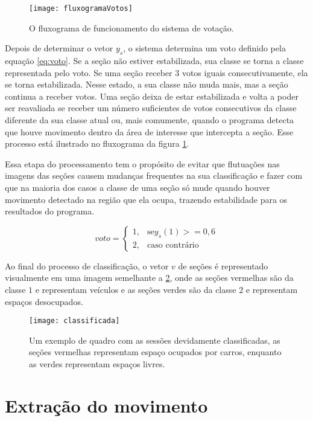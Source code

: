 \begin{figure}
	\centering
	\texttt{[image: fluxogramaVotos]}
	\label{fig:fluxogramaVotos}
	\caption{O fluxograma de funcionamento do sistema de votação.}
	\centering
\end{figure}


Depois de determinar o vetor $y_s$, o sistema determina um voto definido pela equação \ref{eq:voto}.  Se a seção não estiver estabilizada, sua classe se torna a classe representada pelo voto. Se uma seção receber $3$ votos iguais consecutivamente, ela se torna estabilizada. Nesse estado, a sua classe não muda mais, mas a seção continua a receber votos. Uma seção deixa de estar estabilizada e volta a poder ser reavaliada se receber um número suficientes de votos consecutivos da classe diferente da sua classe atual ou, mais comumente, quando o programa detecta que houve movimento dentro da área de interesse que intercepta a seção. Esse processo está ilustrado no fluxograma da figura \ref{fig:fluxogramaVotos}.

Essa etapa do processamento tem o propósito de evitar que flutuações nas imagens das seções causem mudanças frequentes na sua classificação e fazer com que na maioria dos casos a classe de uma seção só mude quando houver movimento detectado na região que ela ocupa, trazendo estabilidade para os resultados do programa.

\begin{equation}
voto= 
\begin{cases}
    1,& \text{se} y_s(1) >= 0,6\\
    2,& \text{caso contrário}
\end{cases}
\label{eq:voto}
\end{equation}


Ao final do processo de classificação, o vetor $v$ de seções é representado visualmente em uma imagem semelhante a \ref{fig:exemploClassificacao}, onde as seções vermelhas são da classe $1$ e representam veículos e as seções verdes são da classe $2$ e representam espaços desocupados.

\begin{figure}
\centering
\texttt{[image: classificada]}
\centering
\caption{Um exemplo de quadro com as sessões devidamente classificadas, as seções vermelhas representam espaço ocupados por carros, enquanto as verdes representam espaços livres.}
\label{fig:exemploClassificacao}
\end{figure}

\section{Extração do movimento}

